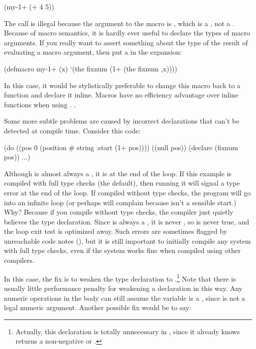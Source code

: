 \begin{lisp}
(my-1+ (+ 4 5))
\end{lisp}

The call is illegal because the argument to the macro is , which is a , not a .  Because of
macro semantics, it is hardly ever useful to declare the types of
macro arguments.  If you really want to assert something about the
type of the result of evaluating a macro argument, then put a
 in the expansion:

\begin{lisp}
(defmacro my-1+ (x)
  `(the fixnum (1+ (the fixnum ,x))))
\end{lisp}

In this case, it would be stylistically preferable to change this
macro back to a function and declare it inline.  Macros have no
efficiency advantage over inline functions when using \python{}.
.


Some more subtle problems are caused by incorrect declarations that
can't be detected at compile time.  Consider this code:

\begin{example}
(do ((pos 0 (position # string :start (1+ pos))))
    ((null pos))
  (declare (fixnum pos))
  ...)
\end{example}

Although  is almost always a , it is \false{}
at the end of the loop.  If this example is compiled with full type
checks (the default), then running it will signal a type error at the
end of the loop.  If compiled without type checks, the program will go
into an infinite loop (or perhaps  will complain
because  isn't a sensible start.)  Why?  Because if
you compile without type checks, the compiler just quietly believes
the type declaration.  Since  is always a , it
is never \nil, so  is never true, and the loop
exit test is optimized away.  Such errors are sometimes flagged by
unreachable code notes (), but it is still
important to initially compile any system with full type checks, even
if the system works fine when compiled using other compilers.

In this case, the fix is to weaken the type declaration to
.\footnote{Actually, this declaration is
  totally unnecessary in \python{}, since it already knows
   returns a non-negative  or \false.}
Note that there is usually little performance penalty for weakening a
declaration in this way.  Any numeric operations in the body can still
assume the variable is a , since \false{} is not a legal
numeric argument.  Another possible fix would be to say:

